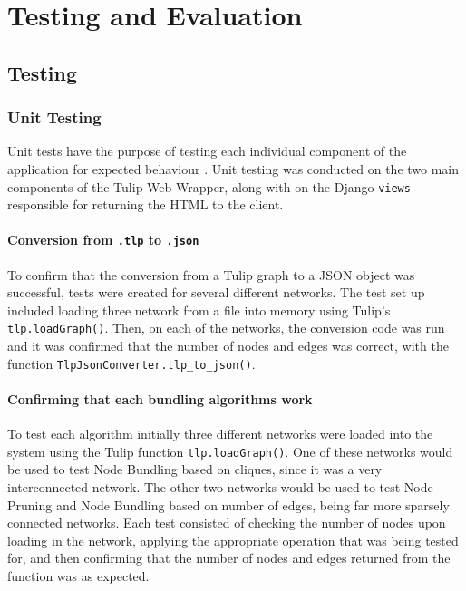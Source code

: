 \documentclass[../dissertation.tex]{subfiles}
\begin{document}
\chapter{Testing and Evaluation}
\label{chap:testing-eval}

\section{Testing}

\subsection{Unit Testing}

Unit tests have the purpose of testing each individual component of the application for expected behaviour \cite{runeson2006survey}. Unit testing was conducted on the two main components of the Tulip Web Wrapper, along with on the Django \texttt{views} responsible for returning the HTML to the client. 

\subsubsection{Conversion from \texttt{.tlp} to \texttt{.json}}

To confirm that the conversion from a Tulip graph to a JSON object was successful, tests were created for several different networks. The test set up included loading three network from a file into memory using Tulip's \texttt{tlp.loadGraph()}. Then, on each of the networks, the conversion code was run and it was confirmed that the number of nodes and edges was correct, with the function \texttt{TlpJsonConverter.tlp\_to\_json()}.

\subsubsection{Confirming that each bundling algorithms work}

To test each algorithm initially three different networks were loaded into the system using the Tulip function \texttt{tlp.loadGraph()}. One of these networks would be used to test Node Bundling based on cliques, since it was a very interconnected network. The other two networks would be used to test Node Pruning and Node Bundling based on number of edges, being far more sparsely connected networks. Each test consisted of checking the number of nodes upon loading in the network, applying the appropriate operation that was being tested for, and then confirming that the number of nodes and edges returned from the function was as expected.
\end{document}
